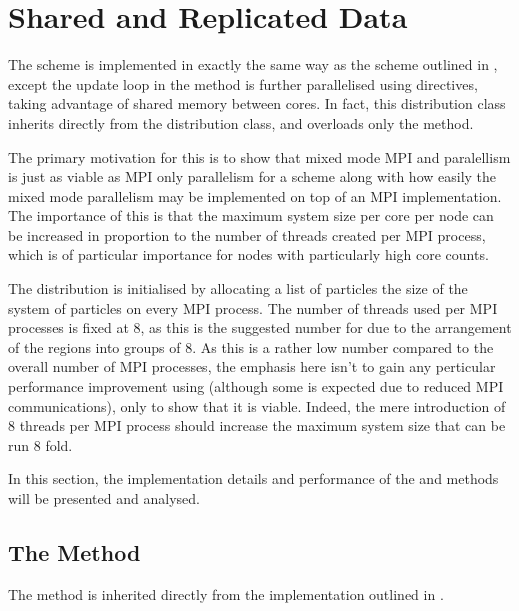 \section{Shared and Replicated Data}

The \sharedandreplicateddata{} scheme is implemented in exactly the same
way as the \replicateddata{} scheme outlined in 
,
except the update loop in the \pairoperation{} method is further
parallelised using \openmp{} directives, taking advantage of shared
memory between cores.
%
In fact, this distribution class inherits directly from the
\replicateddata{} distribution class, and overloads only the
\pairoperation{} method.


The primary motivation for this is to show that mixed mode MPI and \openmp{}
paralellism is just as viable as MPI only parallelism for a \replicateddata{}
scheme along with how easily the mixed mode parallelism may be implemented
on top of an MPI implementation.
%
The importance of this is that the maximum system size per core per node
can be increased in proportion to the number of \openmp{} threads
created per MPI process, which is of particular importance for nodes with
particularly high core counts.

%
The \sharedandreplicateddata{} distribution is initialised by
allocating a list of particles the size of the system of particles
on every MPI process.
%
The number of \openmp{} threads used per MPI processes is fixed at 8,
as this is the suggested number for \hector{} due to the arrangement
of the \numa{} regions into groups of 8.
%
As this is a rather low number compared to the overall number of MPI
processes, the emphasis here isn't to gain any perticular performance
improvement using \openmp{} (although some is expected due to reduced
MPI communications),
only to show that it is viable.
%
Indeed, the mere introduction of 8 threads per MPI process should increase
the maximum system size that can be run 8 fold.

In this section,
the implementation details and performance of
the \individualoperation{} and \pairoperation{} methods
will be presented and analysed.


\subsection{The \individualoperation{} Method}

The \individualoperation{} method is inherited directly from
the implementation outlined in
.


